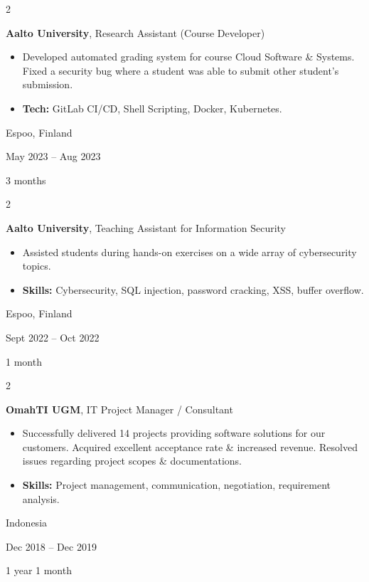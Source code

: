 \documentclass[10pt, a4paper]{article}
\newenvironment{highlights}{
    \begin{itemize}[
        topsep=0.10 cm,
        parsep=0.10 cm,
        partopsep=0pt,
        itemsep=0pt,
        leftmargin=0 cm + 10pt
    ]
}{
    \end{itemize}
} %
\newenvironment{twocolentry}[2][]{
    \onecolentry
    \def\secondColumn{#2}
    \setcolumnwidth{\fill, 3.1 cm}
    \begin{paracol}{2}
}{
    \switchcolumn \raggedleft \secondColumn
    \end{paracol}
    \endonecolentry
} %
\begin{document}
        \begin{twocolentry}{
            Espoo, Finland

        May 2023 – Aug 2023

        3 months
        }
            \textbf{Aalto University}, Research Assistant (Course Developer)
            \begin{highlights}
                \item Developed automated grading system for course Cloud Software \& Systems. Fixed a security bug where a student was able to submit other student's submission.
                \item \textbf{Tech:} GitLab CI/CD, Shell Scripting, Docker, Kubernetes.
            \end{highlights}
        \end{twocolentry}


        \vspace{0.2 cm}

        \begin{twocolentry}{
            Espoo, Finland

        Sept 2022 – Oct 2022

        1 month
        }
            \textbf{Aalto University}, Teaching Assistant for Information Security
            \begin{highlights}
                \item Assisted students during hands-on exercises on a wide array of cybersecurity topics.
                \item \textbf{Skills:} Cybersecurity, SQL injection, password cracking, XSS, buffer overflow.
            \end{highlights}
        \end{twocolentry}


        \vspace{0.2 cm}

        \begin{twocolentry}{
            Indonesia

        Dec 2018 – Dec 2019

        1 year 1 month
        }
            \textbf{OmahTI UGM}, IT Project Manager / Consultant
            \begin{highlights}
                \item Successfully delivered 14 projects providing software solutions for our customers. Acquired excellent acceptance rate \& increased revenue. Resolved issues regarding project scopes \& documentations.
                \item \textbf{Skills:} Project management, communication, negotiation, requirement analysis.
            \end{highlights}
        \end{twocolentry}
\end{document}
